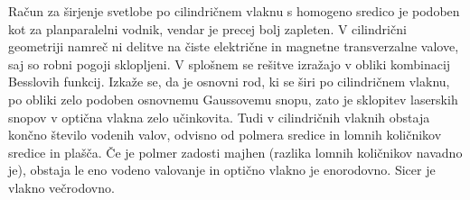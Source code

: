 Račun za širjenje svetlobe po cilindričnem vlaknu s homogeno sredico
je podoben kot za planparalelni vodnik, vendar je precej bolj
zapleten. V cilindrični geometriji namreč ni delitve na čiste električne in 
magnetne transverzalne valove, saj so robni pogoji sklopljeni. V splošnem se rešitve izražajo 
v obliki kombinacij Besslovih funkcij. Izkaže se, da je osnovni rod, ki se  širi po
cilindričnem vlaknu, po obliki zelo podoben osnovnemu Gaussovemu snopu, zato je sklopitev
laserskih snopov v optična vlakna zelo učinkovita.
Tudi v cilindričnih vlaknih obstaja končno število vodenih valov, odvisno od polmera sredice in
lomnih količnikov sredice in plašča. Če je polmer zadosti majhen (razlika lomnih
količnikov navadno je), obstaja le eno vodeno valovanje in optično vlakno je 
enorodovno. Sicer je vlakno večrodovno.

